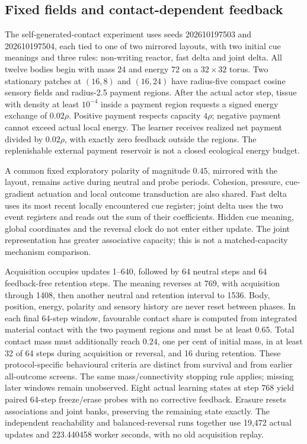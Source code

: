 \subsection*{Fixed fields and contact-dependent feedback}

The self-generated-contact experiment uses seeds 202610197503 and 202610197504, each tied to one of two mirrored layouts, with two initial cue meanings and three rules: non-writing reactor, fast delta and joint delta. All twelve bodies begin with mass 24 and energy 72 on a $32\times32$ torus. Two stationary patches at $(16,8)$ and $(16,24)$ have radius-five compact cosine sensory fields and radius-2.5 payment regions. After the actual actor step, tissue with density at least $10^{-4}$ inside a payment region requests a signed energy exchange of $0.02\rho$. Positive payment respects capacity $4\rho$; negative payment cannot exceed actual local energy. The learner receives realized net payment divided by $0.02\rho$, with exactly zero feedback outside the regions. The replenishable external payment reservoir is not a closed ecological energy budget.

A common fixed exploratory polarity of magnitude $0.45$, mirrored with the layout, remains active during neutral and probe periods. Cohesion, pressure, cue-gradient actuation and local outcome transduction are also shared. Fast delta uses its most recent locally encountered cue register; joint delta uses the two event registers and reads out the sum of their coefficients. Hidden cue meaning, global coordinates and the reversal clock do not enter either update. The joint representation has greater associative capacity; this is not a matched-capacity mechanism comparison.

Acquisition occupies updates 1--640, followed by 64 neutral steps and 64 feedback-free retention steps. The meaning reverses at 769, with acquisition through 1408, then another neutral and retention interval to 1536. Body, position, energy, polarity and sensory history are never reset between phases. In each final 64-step window, favourable contact share is computed from integrated material contact with the two payment regions and must be at least $0.65$. Total contact mass must additionally reach $0.24$, one per cent of initial mass, in at least 32 of 64 steps during acquisition or reversal, and 16 during retention. These protocol-specific behavioural criteria are distinct from survival and from earlier all-outcome screens. The same mass/connectivity stopping rule applies; missing later windows remain unobserved. Eight actual learning states at step 768 yield paired 64-step freeze/erase probes with no corrective feedback. Erasure resets associations and joint banks, preserving the remaining state exactly. The independent reachability and balanced-reversal runs together use 19,472 actual updates and 223.440458 worker seconds, with no old acquisition replay.

